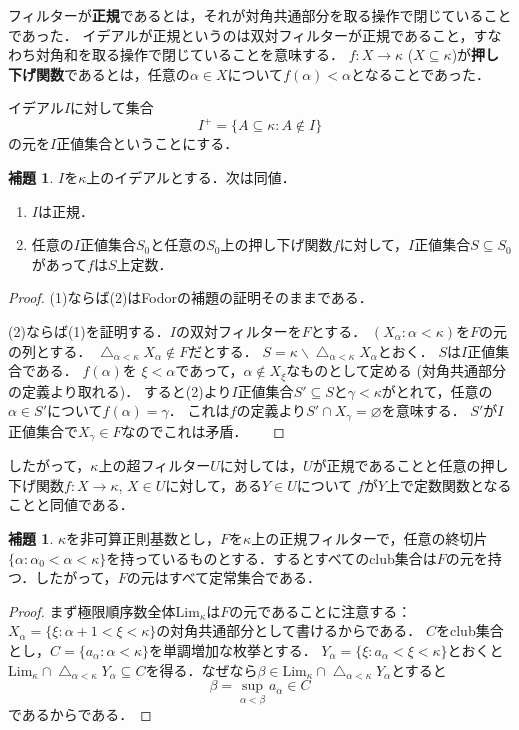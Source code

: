 \documentclass[uplatex]{jsarticle}
\newcommand{\Lim}{\mathrm{Lim}}
\DeclareMathOperator*{\diagintr}{\triangle}
\renewcommand\emptyset{\varnothing}
\renewcommand\subset{\subseteq}
\renewcommand{\setminus}{\smallsetminus}
\theoremstyle{definition}
\newtheorem{lem}[thm]{補題}
\begin{document}
	フィルターが\textbf{正規}であるとは，それが対角共通部分を取る操作で閉じていることであった．
	イデアルが正規というのは双対フィルターが正規であること，すなわち対角和を取る操作で閉じていることを意味する．
	$f \colon X \to \kappa$ ($X \subset \kappa$)が\textbf{押し下げ関数}であるとは，任意の$\alpha \in X$について$f(\alpha) < \alpha$となることであった．
		
	イデアル$I$に対して集合
	\[
	I^+ = \{ A \subset \kappa : A \not \in I \}
	\]
	の元を$I$正値集合ということにする．
	
	\begin{lem}
		$I$を$\kappa$上のイデアルとする．次は同値．
		\begin{enumerate}
			\item $I$は正規．
			\item 任意の$I$正値集合$S_0$と任意の$S_0$上の押し下げ関数$f$に対して，$I$正値集合$S \subset S_0$があって$f$は$S$上定数．
		\end{enumerate}
	\end{lem}
	\begin{proof}
		(1)ならば(2)はFodorの補題の証明そのままである．
		
		(2)ならば(1)を証明する．$I$の双対フィルターを$F$とする．
		$(X_\alpha : \alpha < \kappa)$を$F$の元の列とする．
		$\diagintr_{\alpha < \kappa} X_\alpha \not \in F$だとする．
		$S = \kappa \setminus \diagintr_{\alpha < \kappa} X_\alpha$とおく．
		$S$は$I$正値集合である．
		$f(\alpha)$を $\xi < \alpha$であって，$\alpha \not \in X_\xi$なものとして定める (対角共通部分の定義より取れる)．
		すると(2)より$I$正値集合$S' \subset S$と$\gamma < \kappa$がとれて，任意の$\alpha \in S'$について$f(\alpha) = \gamma$．
		これは$f$の定義より$S' \cap X_\gamma = \emptyset$を意味する．
		$S'$が$I$正値集合で$X_\gamma \in F$なのでこれは矛盾．
	　\end{proof}
	
	したがって，$\kappa$上の超フィルター$U$に対しては，$U$が正規であることと任意の押し下げ関数$f \colon X \to \kappa$, $X \in U$に対して，ある$Y \in U$について $f$が$Y$上で定数関数となることと同値である．
	
	\begin{lem}
		$\kappa$を非可算正則基数とし，$F$を$\kappa$上の正規フィルターで，任意の終切片$\{\alpha : \alpha_0 < \alpha < \kappa\}$を持っているものとする．するとすべてのclub集合は$F$の元を持つ．したがって，$F$の元はすべて定常集合である．
	\end{lem}
	\begin{proof}
			まず極限順序数全体$\Lim_\kappa$は$F$の元であることに注意する：$X_\alpha = \{ \xi : \alpha + 1 < \xi < \kappa \}$の対角共通部分として書けるからである．
			$C$をclub集合とし，$C = \{ a_\alpha : \alpha < \kappa \}$を単調増加な枚挙とする．
			$Y_\alpha = \{ \xi : a_\alpha < \xi < \kappa \}$とおくと$\Lim_\kappa \cap \diagintr_{\alpha < \kappa} Y_\alpha \subset C$を得る．なぜなら$\beta \in \Lim_\kappa \cap \diagintr_{\alpha < \kappa} Y_\alpha$とすると
			\[\beta = \sup_{\alpha < \beta} a_\alpha \in C \]
			であるからである．
	\end{proof}
	
\end{document}
